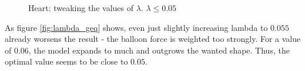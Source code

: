 \begin{figure}[!hbt]
\centering   
{}
\caption{Heart: tweaking the values of $ \lambda $. $\lambda \leq 0.05$}
\label{fig:lambda_leq}
\end{figure}

As figure \ref{fig:lambda_geq} shows, even just slightly increasing lambda to $0.055$ already worsens the result - the balloon force is weighted too strongly. For a value of $0.06$, the model expands to much and outgrows the wanted shape. Thus, the optimal value seems to be close to $0.05$.


